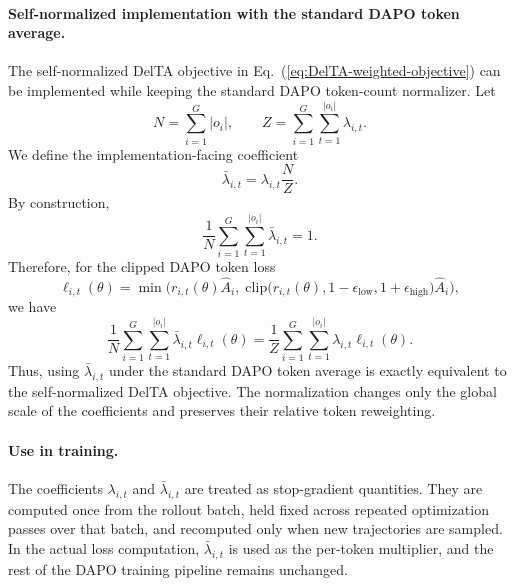 \documentclass{llmxive}
\providecommand{\Eq}[1]{Eq.~(\ref{#1})}
\begin{document}
\paragraph{Self-normalized implementation with the standard DAPO token average.}
The self-normalized DelTA objective in \Eq{eq:DelTA-weighted-objective} can be implemented while keeping the standard DAPO token-count normalizer.
Let
\[
N
=
\sum_{i=1}^{G}|o_i|,
\qquad
Z
=
\sum_{i=1}^{G}\sum_{t=1}^{|o_i|}\lambda_{i,t}.
\]
We define the implementation-facing coefficient
\[
\bar\lambda_{i,t}
=
\lambda_{i,t}\frac{N}{Z}.
\]
By construction,
\[
\frac{1}{N}
\sum_{i=1}^{G}\sum_{t=1}^{|o_i|}
\bar\lambda_{i,t}
=
1.
\]
Therefore, for the clipped DAPO token loss
\[
\ell_{i,t}(\theta)
=
\min\!\Big(
r_{i,t}(\theta)\hat A_i,\;
\mathrm{clip}\!\big(
r_{i,t}(\theta),
1-\epsilon_{\mathrm{low}},
1+\epsilon_{\mathrm{high}}
\big)\hat A_i
\Big),
\]
we have
\[
\frac{1}{N}
\sum_{i=1}^{G}\sum_{t=1}^{|o_i|}
\bar\lambda_{i,t}\ell_{i,t}(\theta)
=
\frac{1}{Z}
\sum_{i=1}^{G}\sum_{t=1}^{|o_i|}
\lambda_{i,t}\ell_{i,t}(\theta).
\]
Thus, using \(\bar\lambda_{i,t}\) under the standard DAPO token average is exactly equivalent to the self-normalized DelTA objective.
The normalization changes only the global scale of the coefficients and preserves their relative token reweighting.

\paragraph{Use in training.}
The coefficients \(\lambda_{i,t}\) and \(\bar\lambda_{i,t}\) are treated as stop-gradient quantities.
They are computed once from the rollout batch, held fixed across repeated optimization passes over that batch, and recomputed only when new trajectories are sampled.
In the actual loss computation, \(\bar\lambda_{i,t}\) is used as the per-token multiplier, and the rest of the DAPO training pipeline remains unchanged.
\end{document}
